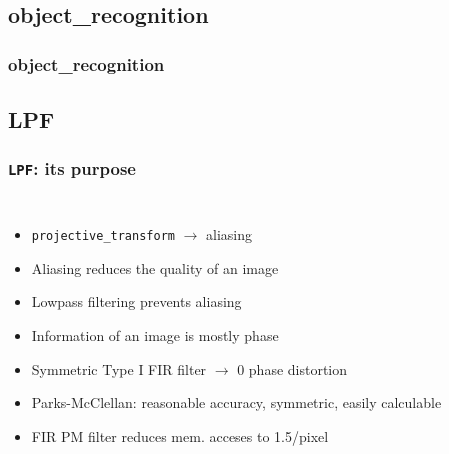 \documentclass{beamer}
\begin{document}
\subsection{object\_recognition}
\begin{frame}
	\frametitle{object\_recognition}
\end{frame}

\subsection{LPF}
\begin{frame}
	\frametitle{{\tt LPF}: its purpose}
	\begin{columns}[c]
		\begin{itemize}
		\item<1-> {\tt projective\_transform} \(\rightarrow\) aliasing
		\item<3-> Aliasing reduces the quality of an image
		\item<4-> Lowpass filtering prevents aliasing
		\item<5-> Information of an image is mostly phase
		\item<8-> Symmetric Type I FIR filter \(\rightarrow\) 0 phase distortion
		\item<9-> Parks-McClellan: reasonable accuracy, symmetric, easily calculable
		\item<10-> FIR PM filter reduces mem. acceses to 1.5/pixel
		\end{itemize}
	
	\end{columns}
\end{frame}
\end{document}
